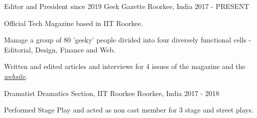 

\begin{cventries}

  \cventry
    {Editor and President since 2019} %
    {Geek Gazette} %
    {Roorkee, India} %
    {2017 - PRESENT} %
    {
      \begin{cvitems} %
        \item {Official Tech Magazine based in IIT Roorkee.}
        \item {Manage a group of 80 'geeky' people divided into four diversely functional cells - Editorial, Design, Finance and Web.}
        \item {Written and edited articles and interviews for 4 issues of the magazine and the \emph{\href{https://geekgazette.org/}{website}}.}
      \end{cvitems}
    }

  \cventry
    {Dramatist} %
    {Dramatics Section, IIT Roorkee} %
    {Roorkee, India} %
    {2017 - 2018} %
    {
      \begin{cvitems} %
        \item {Performed Stage Play and acted as non cast member for 3 stage and street plays.}
      \end{cvitems}
    }

\end{cventries}
